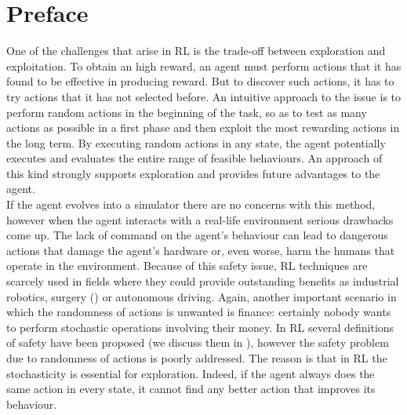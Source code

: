 

\chapter*{Preface}
One of the challenges that arise in \acf{RL} is the trade-off between exploration and exploitation. To obtain an high reward, an agent must perform actions that it has found to be effective in producing reward. But to discover such actions, it has to try actions that it has not selected before. An intuitive approach to the issue is to perform random actions in the beginning of the task, so as to test as many actions as possible in a first phase and then exploit the most rewarding actions in the long term. By executing random actions in any state, the agent potentially executes and evaluates the entire range of feasible behaviours. An approach of this kind strongly supports exploration and provides future advantages to the agent.\\
\newline
If the agent evolves into a simulator there are no concerns with this method, however when the agent interacts with a real-life environment serious drawbacks come up. The lack of command on the agent's behaviour can lead to dangerous actions that damage the agent's hardware or, even worse, harm the humans that operate in the environment. Because of this safety issue, \ac{RL} techniques are scarcely used in fields where they could provide outstanding benefits as industrial robotics, surgery (\cite{baek2018PathPlanning}) or autonomous driving. Again, another important scenario in which the randomness of actions is unwanted is finance: certainly nobody wants to perform stochastic operations involving their money. In \ac{RL} several definitions of safety have been proposed (we discuss them in ), however the safety problem due to randomness of actions is poorly addressed. The reason is that in \ac{RL} the stochasticity is essential for exploration. Indeed, if the agent always does the same action in every state, it cannot find any better action that improves its behaviour.\\
\newline
